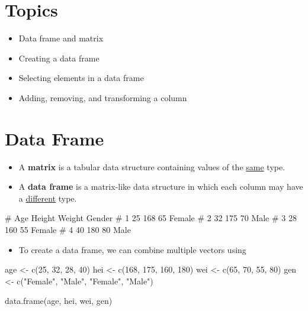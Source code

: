 \documentclass[
  letterpaper,
  DIV=11,
  numbers=noendperiod]{scrreprt}
\newenvironment{Shaded}{\begin{snugshade}}{\end{snugshade}}
\newcommand{\CommentTok}[1]{\textcolor[rgb]{0.37,0.37,0.37}{#1}}
\newcommand{\DecValTok}[1]{\textcolor[rgb]{0.68,0.00,0.00}{#1}}
\newcommand{\FunctionTok}[1]{\textcolor[rgb]{0.28,0.35,0.67}{#1}}
\newcommand{\NormalTok}[1]{\textcolor[rgb]{0.00,0.23,0.31}{#1}}
\newcommand{\OtherTok}[1]{\textcolor[rgb]{0.00,0.23,0.31}{#1}}
\newcommand{\StringTok}[1]{\textcolor[rgb]{0.13,0.47,0.30}{#1}}
\providecommand{\tightlist}{%
  \setlength{\itemsep}{0pt}\setlength{\parskip}{0pt}}\usepackage{longtable,booktabs,array}
\begin{document}
\section{Topics}\label{topics-4}

\begin{itemize}
\item
  Data frame and matrix
\item
  Creating a data frame
\item
  Selecting elements in a data frame
\item
  Adding, removing, and transforming a column
\end{itemize}

\section{Data Frame}\label{data-frame}

\begin{itemize}
\item
  A \textbf{matrix} is a tabular data structure containing values of the
  \ul{same} type.
\item
  A \textbf{data frame} is a matrix-like data structure in which each
  column may have a \ul{different} type.
\end{itemize}

\begin{Shaded}
\begin{Highlighting}[]
\CommentTok{\#   Age Height Weight Gender}
\CommentTok{\# 1  25    168     65 Female}
\CommentTok{\# 2  32    175     70   Male}
\CommentTok{\# 3  28    160     55 Female}
\CommentTok{\# 4  40    180     80   Male}
\end{Highlighting}
\end{Shaded}

\begin{itemize}
\tightlist
\item
  To create a data frame, we can combine multiple vectors using
\end{itemize}

\begin{Shaded}
\begin{Highlighting}[]
\NormalTok{age }\OtherTok{\textless{}{-}} \FunctionTok{c}\NormalTok{(}\DecValTok{25}\NormalTok{, }\DecValTok{32}\NormalTok{, }\DecValTok{28}\NormalTok{, }\DecValTok{40}\NormalTok{)}
\NormalTok{hei }\OtherTok{\textless{}{-}} \FunctionTok{c}\NormalTok{(}\DecValTok{168}\NormalTok{, }\DecValTok{175}\NormalTok{, }\DecValTok{160}\NormalTok{, }\DecValTok{180}\NormalTok{)}
\NormalTok{wei }\OtherTok{\textless{}{-}} \FunctionTok{c}\NormalTok{(}\DecValTok{65}\NormalTok{, }\DecValTok{70}\NormalTok{, }\DecValTok{55}\NormalTok{, }\DecValTok{80}\NormalTok{)}
\NormalTok{gen }\OtherTok{\textless{}{-}} \FunctionTok{c}\NormalTok{(}\StringTok{"Female"}\NormalTok{, }\StringTok{"Male"}\NormalTok{, }\StringTok{"Female"}\NormalTok{, }\StringTok{"Male"}\NormalTok{)}

\FunctionTok{data.frame}\NormalTok{(age, hei, wei, gen)}
\end{Highlighting}
\end{Shaded}
\end{document}
